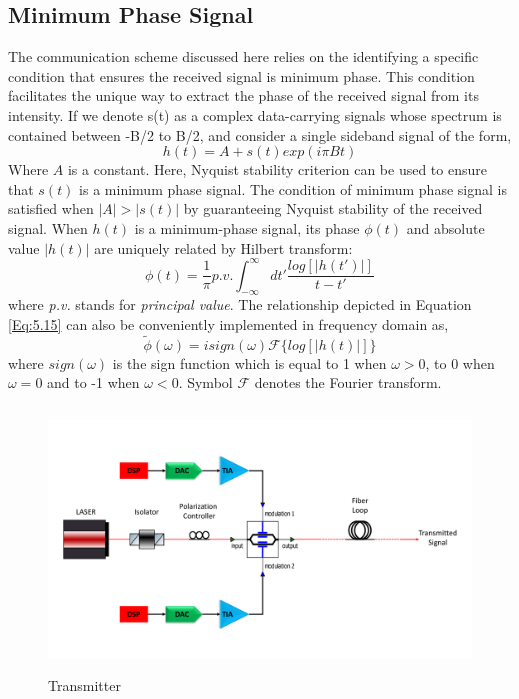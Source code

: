 \subsection{Minimum Phase Signal}
The communication scheme discussed here relies on the identifying a specific condition that ensures the received signal is minimum phase. This condition facilitates the unique way to extract the phase of the received signal from its intensity. If we denote s(t) as a complex data-carrying signals whose spectrum is contained between -B/2 to B/2, and consider a single sideband signal of the form,
\begin{equation}
h(t)=A+s(t)exp(i\pi Bt)
\end{equation}
Where $A$ is a constant. Here, Nyquist stability criterion can be used to ensure that $s(t)$ is a minimum phase signal. The condition of minimum phase signal is satisfied when $|A|>|s(t)|$ by guaranteeing Nyquist stability of the received signal.
When $h(t)$ is a minimum-phase signal, its phase $\phi(t)$ and absolute value $|h(t)|$ are uniquely related by Hilbert transform:
\begin{equation}
	\phi(t)=\frac{1}{\pi}  p.v. \int_{-\infty}^{\infty} dt' \frac{log[|h(t')|]}{t-t'}
	\label{Eq:5.15}
\end{equation}
where \textit{p.v.} stands for \textit{principal value}. The relationship depicted in Equation \ref{Eq:5.15} can also be conveniently implemented in frequency domain as,
\begin{equation}
\tilde{\phi}(\omega)=i sign(\omega) \mathcal{F} \{log[|h(t)|]\}
\end{equation}
where $sign(\omega)$ is the sign function which is equal to 1 when $\omega>0$, to 0 when $\omega=0$ and to -1 when $\omega<0$. Symbol $\mathcal{F}$ denotes the Fourier transform.
\begin{figure}[h]
	\centering
	\includegraphics[width=1.0\textwidth, height=7cm]{./sdf/simplified_coherent_receiver/figures/Single_Polarization_Tx.pdf}
	\caption{Transmitter}\label{Transmitter}
\end{figure}

